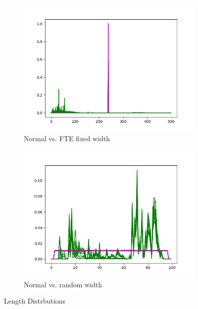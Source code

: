 \documentclass[ %
                    author={Samuel Russell},
                supervisor={Prof. Bogdan Warinschi},
                    degree={MEng},
                     title={Innocuous Ciphertexts},
                  subtitle={The DE-CENSOR Scheme},
                      type={Research},
                      year={2018} ]{dissertation}
\begin{document}
\begin{figure}[h]
\begin{subfigure}[b]{.49\linewidth}
\includegraphics[width=\linewidth]{fake_length_dist}
\caption{Normal vs. FTE fixed width}
\label{fig:fake_length_dist}
\end{subfigure}
\begin{subfigure}[b]{.49\linewidth}
\includegraphics[width=\linewidth]{uniform_length_dist}
\caption{Normal vs. random width}
\label{fig:uniform_length_dist}
\end{subfigure}
\caption{Length Distrbutions}
\label{fig:length_dists}
\end{figure}
\end{document}
